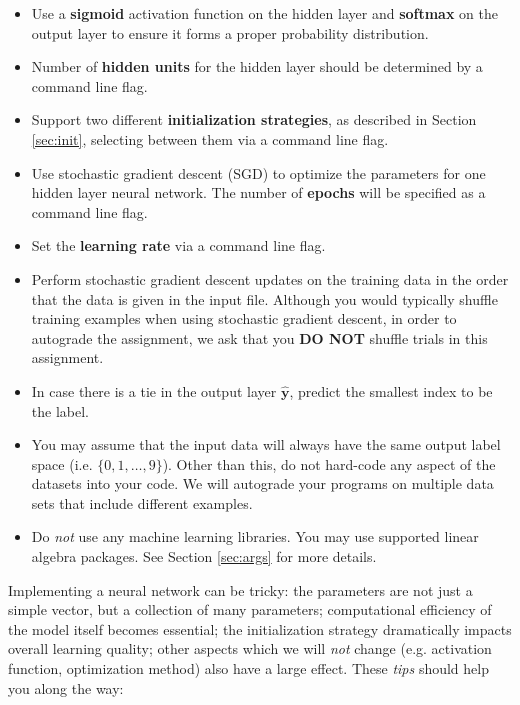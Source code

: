 \documentclass[11pt,addpoints,answers]{exam}
\newcommand{\yv}{\mathbf{y}}
\begin{document}
\begin{itemize}
    \item Use a {\bf sigmoid} activation function on the hidden layer and {\bf softmax} on the  output layer to ensure it forms a proper probability distribution.
    \item Number of {\bf hidden units} for the hidden layer should be determined by a command line flag.
    \item Support two different {\bf initialization strategies}, as described in Section \ref{sec:init}, selecting between them via a command line flag.
    \item Use stochastic gradient descent (SGD) to optimize the parameters for one hidden layer neural network. The number of {\bf epochs} will be specified as a command line flag. 
    \item Set the {\bf learning rate} via a command line flag.
    \item Perform stochastic gradient descent updates on the training data in the order that the data is given in the input file. Although you would typically shuffle training examples when using stochastic gradient descent, in order to autograde the assignment, we ask that you {\bf DO NOT} shuffle trials in this assignment.
    \item In case there is a tie in the output layer $\hat{\yv}$, predict the smallest index to be the label.
    \item You may assume that the input data will always have the same output label space (i.e. $\{0,1,\ldots,9\}$). Other than this, do not hard-code any aspect of the datasets into your code. We will autograde your programs on multiple data sets that include different examples.
    \item Do \emph{not} use any machine learning libraries. You may use supported linear algebra packages. See Section \ref{sec:args} for more details.
\end{itemize}

Implementing a neural network can be tricky: the parameters are not just a simple vector, but a collection of many parameters; computational efficiency of the model itself becomes essential; the initialization strategy dramatically impacts overall learning quality;  other aspects which we will \emph{not} change (e.g. activation function, optimization method) also have a large effect. These \emph{tips} should help you along the way:
\end{document}
